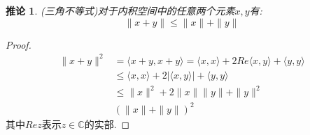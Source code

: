 \documentclass[a4paper,11pt]{book}
\newtheorem{proof}{证明}[section]
\newtheorem{corollary}{推论}[section]
\begin{document}
\begin{corollary}
  (三角不等式)对于内积空间中的任意两个元素$x,y$有:
  \begin{equation*}
    \|x+y\|\leq\|x\|+\|y\|
  \end{equation*}
\end{corollary}
\begin{proof}
  \begin{equation*}
  \begin{split}
     \|x+y\|^2& =\langle x+y,x+y\rangle=\langle x,x\rangle+2Re\langle x,y\rangle+\langle y,y\rangle \\
       & \leq\langle x,x\rangle+2|\langle x,y\rangle|+\langle y,y\rangle \\
       & \leq\|x\|^2+2\|x\|\|y\|+\|y\|^2 \\
       & (\|x\|+\|y\|)^2
  \end{split}
  \end{equation*}
  其中$Re z$表示$z\in \mathbb{C}$的实部.
\end{proof}
\end{document}
